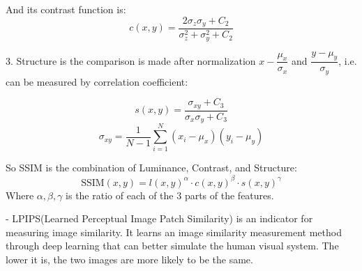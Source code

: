 And its contrast function is:
$$c(x, y)=\frac{2 \sigma_z \sigma_y+C_2}{\sigma_z^2+\sigma_y^2+C_2}$$

3. Structure is the comparison is made after normalization $x-\dfrac{\mu_x}{\sigma_x}$ and $\dfrac{y-\mu_y}{\sigma_y}$, i.e. can be measured by correlation coefficient:

$$s(x, y)=\frac{\sigma_{x y}+C_3}{\sigma_x \sigma_y+C_3}$$
$$\sigma_{x y}=\frac{1}{N-1} \sum_{i=1}^N\left(x_i-\mu_x\right)\left(y_i-\mu_y\right)$$

So SSIM is the combination of Luminance, Contrast, and Structure:
$$\text{SSIM}(x, y)=l(x, y)^\alpha \cdot c(x, y)^\beta \cdot s(x, y)^\gamma$$
Where $\alpha, \beta, \gamma$ is the ratio of each of the $3$ parts of the features.

- LPIPS(Learned Perceptual Image Patch Similarity)  is an indicator for measuring image similarity. It learns an image similarity measurement method through deep learning that can better simulate the human visual system.  The lower it is, the two images are more likely to be the same.